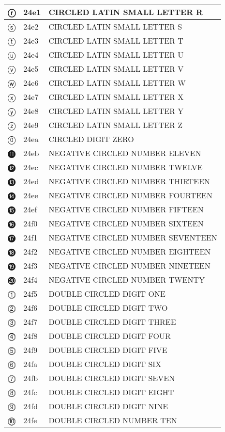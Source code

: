 \documentclass[12pt,letterpaper,openany]{book}
\begin{document}
\begin{center}
\begin{supertabular}{|m{0.25in}|m{0.5in}|m{4in}|}
ⓡ & 24e1 & CIRCLED LATIN SMALL LETTER R\\\hline
ⓢ & 24e2 & CIRCLED LATIN SMALL LETTER S\\\hline
ⓣ & 24e3 & CIRCLED LATIN SMALL LETTER T\\\hline
ⓤ & 24e4 & CIRCLED LATIN SMALL LETTER U\\\hline
ⓥ & 24e5 & CIRCLED LATIN SMALL LETTER V\\\hline
ⓦ & 24e6 & CIRCLED LATIN SMALL LETTER W\\\hline
ⓧ & 24e7 & CIRCLED LATIN SMALL LETTER X\\\hline
ⓨ & 24e8 & CIRCLED LATIN SMALL LETTER Y\\\hline
ⓩ & 24e9 & CIRCLED LATIN SMALL LETTER Z\\\hline
⓪ & 24ea & CIRCLED DIGIT ZERO\\\hline
⓫ & 24eb & NEGATIVE CIRCLED NUMBER ELEVEN\\\hline
⓬ & 24ec & NEGATIVE CIRCLED NUMBER TWELVE\\\hline
⓭ & 24ed & NEGATIVE CIRCLED NUMBER THIRTEEN\\\hline
⓮ & 24ee & NEGATIVE CIRCLED NUMBER FOURTEEN\\\hline
⓯ & 24ef & NEGATIVE CIRCLED NUMBER FIFTEEN\\\hline
⓰ & 24f0 & NEGATIVE CIRCLED NUMBER SIXTEEN\\\hline
⓱ & 24f1 & NEGATIVE CIRCLED NUMBER SEVENTEEN\\\hline
⓲ & 24f2 & NEGATIVE CIRCLED NUMBER EIGHTEEN\\\hline
⓳ & 24f3 & NEGATIVE CIRCLED NUMBER NINETEEN\\\hline
⓴ & 24f4 & NEGATIVE CIRCLED NUMBER TWENTY\\\hline
⓵ & 24f5 & DOUBLE CIRCLED DIGIT ONE\\\hline
⓶ & 24f6 & DOUBLE CIRCLED DIGIT TWO\\\hline
⓷ & 24f7 & DOUBLE CIRCLED DIGIT THREE\\\hline
⓸ & 24f8 & DOUBLE CIRCLED DIGIT FOUR\\\hline
⓹ & 24f9 & DOUBLE CIRCLED DIGIT FIVE\\\hline
⓺ & 24fa & DOUBLE CIRCLED DIGIT SIX\\\hline
⓻ & 24fb & DOUBLE CIRCLED DIGIT SEVEN\\\hline
⓼ & 24fc & DOUBLE CIRCLED DIGIT EIGHT\\\hline
⓽ & 24fd & DOUBLE CIRCLED DIGIT NINE\\\hline
⓾ & 24fe & DOUBLE CIRCLED NUMBER TEN\\\hline

\end{supertabular}
\end{center}
\end{document}
